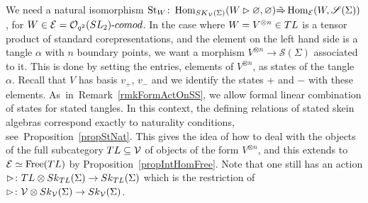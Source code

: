 \documentclass[11pt]{article}
\numberwithin{equation}{section}
\numberwithin{equation}{section}
\newcommand{\St}{\operatorname{St}}
\newcommand{\Free}{\operatorname{Free}}
\newcommand{\Hom}{\operatorname{Hom}}
\newcommand{\Oq}{\mathcal{O}_{q^2}({\rm SL}_2)}
\begin{document}
We need a natural isomorphism $\St_W\colon \Hom_{{\rm SK}_\mathcal{V}(\Sigma)}(W \rhd \varnothing,\varnothing) \tilde{\Rightarrow} \Hom_{\mathcal{E}}(W, \mathscr{S}(\Sigma))$, for $W \in \mathcal{E} = \Oq\text{-}{\rm comod}$. In the case where $W = V^{\otimes n}\in {\rm TL}$ is a tensor product of standard corepresentations, and the element on the left hand side is a tangle $\alpha$ with $n$ boundary points, we want a morphism $V^{\otimes n}\to \mathscr{S}(\Sigma)$ associated to it. This is done by setting the entries, elements of $V^{\otimes n}$, as states of the tangle $\alpha$. Recall that $V$ has basis $v_+$, $v_-$ and we identify the states + and $-$ with these elements. As~in~Remark~\ref{rmkFormActOnSS}, we allow formal linear combination of states for stated tangles. In this context, the defining relations of stated skein algebras correspond exactly to naturality conditions, see~Proposition~\ref{propStNat}.
This gives the idea of how to deal with the objects of the full subcategory ${\rm TL} \subseteq \mathcal{V}$ of objects of the form $V^{\otimes n}$, and this extends to $\mathcal{E} \simeq \Free({\rm TL})$ by Proposition~\ref{propIntHomFree}. Note that one still has an action $\rhd \colon {\rm TL} \otimes {\rm Sk}_{{\rm TL}}(\Sigma) \to {\rm Sk}_{{\rm TL}}(\Sigma)$ which is the restriction of $\rhd \colon \mathcal{V} \otimes {\rm Sk}_\mathcal{V}(\Sigma) \to {\rm Sk}_\mathcal{V}(\Sigma)$.
\end{document}
